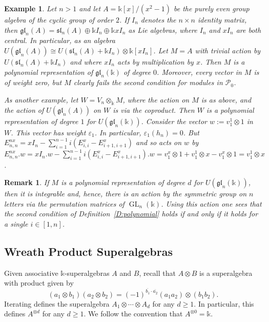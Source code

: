 \documentclass[11pt,reqno]{amsart} %
\newtheorem{example}[theorem]{Example}
\newtheorem{remark}[theorem]{Remark}
\newcommand{\gl}{\mathfrak{gl}}
\renewcommand{\k}{\mathds{k}}
\newcommand{\0}{\bar{0}}
\newcommand{\1}{\bar{1}}
\newcommand{\parity}[1]{\overline{#1}}
\newcommand{\Pol}{\mathcal{P}}
\numberwithin{equation}{subsection}
\begin{document}
\begin{example}\label{Ex:Example1}  Let $n  > 1$ and let $A = \k[x]/(x^{2}-1)$ be the purely even group algebra of the cyclic group of order $2$.  If $I_{n}$ denotes the $n\times n$ identity matrix, then $\gl_{n}(A) =  \mathfrak{sl}_{n}(A)  \oplus \k I_{n} \oplus \k xI_{n}$ as Lie algebras, where $I_{n}$ and $xI_{n}$ are both central.  In particular, as an algebra $U(\gl_{n}(A)) \cong U(\mathfrak{sl}_{n}(A) + \k I_{n})\otimes \k[xI_{n}]$.  Let $M=A$ with trivial action by $U(\mathfrak{sl}_{n}(A) + \k I_{n})$ and where $xI_{n}$ acts by multiplication by $x$. Then $M$ is a polynomial representation of $\gl_{n}(\k)$ of degree $0$.  Moreover, every vector in $M$ is of weight zero, but $M$ clearly fails the second condition for modules in $\Pol_{0}$.

As another example, let $W = V_{n} \otimes_{\k} M$, where the action on $M$ is as above, and the action of $U(\gl_{n}(A))$ on $W$ is via the coproduct.  Then $W$ is a polynomial representation of degree $1$ for $U(\gl_{n}(\k ))$.  Consider the vector $w:=v_{1}^{1} \otimes 1$ in $W$.  This vector has weight $\varepsilon_{1}$.  In particular, $\varepsilon_{1}(h_{n})=0$.  But $E_{n,n}^{nx} = xI_{n} - \sum_{i=1}^{n-1}i(E_{i,i}^{x}-E_{i+1,i+1}^{x})$ and so acts on $w$ by $E_{n,n}^{nx}.w =xI_{n}.w - \sum_{i=1}^{n-1}i(E_{i,i}^{x}-E_{i+1,i+1}^{x}).w = v_{1}^{x} \otimes 1 + v_{1}^{1}\otimes x - v_{1}^{x} \otimes 1= v_{1}^{1}\otimes x$. 
\end{example}



\begin{remark}  If $M$ is a polynomial representation of degree $d$ for $U(\gl_{n}(\k))$, then it is integrable and, hence, there is an action by the symmetric group on $n$ letters via the permutation matrices of $\operatorname{GL}_{n}(\k)$.  Using this action one sees that the second condition of Definition~\ref{D:polynomial} holds if and only if it holds for a single $i \in [1,n]$.
\end{remark}









\subsection{Wreath Product Superalgebras}\label{SS:WreathProductSuperalgebras}  Given associative $\k$-superalgebras $A$ and $B$, recall that $A \otimes B$ is a superalgebra with product given by 
\[
(a_{1} \otimes b_{1})(a_{2} \otimes b_{2}) = (-1)^{\parity{b_{1}} \cdot\parity{a_{2}}} (a_{1}a_{2})\otimes (b_{1}b_{2}).
\]  Iterating defines the superalgebra $A_{1} \otimes \dotsb \otimes  A_{d}$ for any $d \geq 1$.  In particular, this defines $A^{\otimes d}$ for any $d \geq 1$.  We follow the convention that $A^{\otimes 0}= \k$.
\end{document}
